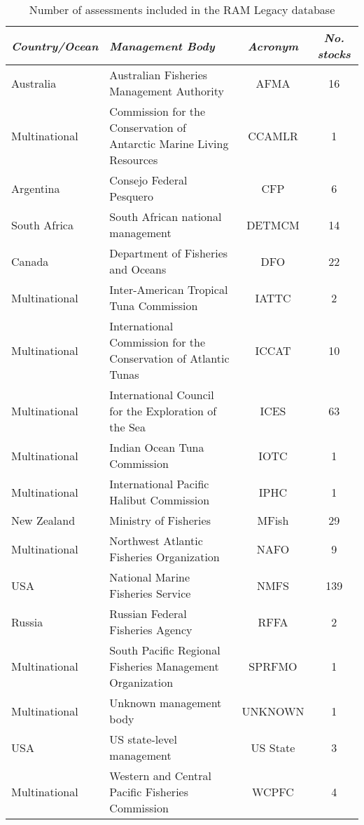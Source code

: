 \begin{table}[ht]
\begin{center}
\caption{Number of assessments included in the RAM Legacy database}
\label{tab:mgmt}
\begin{tabular}{p{3cm}p{5cm}cc}
\textit{Country/Ocean} & \textit{Management Body} & \textit{Acronym} & \textit{No. stocks} \\ \midrule
Australia & Australian Fisheries Management Authority & AFMA &  16 \\ 
  Multinational & Commission for the Conservation of Antarctic Marine Living Resources & CCAMLR &   1 \\ 
  Argentina & Consejo Federal Pesquero & CFP &   6 \\ 
  South Africa & South African national management & DETMCM &  14 \\ 
  Canada & Department of Fisheries and Oceans & DFO &  22 \\ 
  Multinational & Inter-American Tropical Tuna Commission & IATTC &   2 \\ 
  Multinational & International Commission for the Conservation of Atlantic Tunas & ICCAT &  10 \\ 
  Multinational & International Council for the Exploration of the Sea & ICES &  63 \\ 
  Multinational & Indian Ocean Tuna Commission & IOTC &   1 \\ 
  Multinational & International Pacific Halibut Commission & IPHC &   1 \\ 
  New Zealand & Ministry of Fisheries & MFish &  29 \\ 
  Multinational & Northwest Atlantic Fisheries Organization & NAFO &   9 \\ 
  USA & National Marine Fisheries Service & NMFS & 139 \\ 
  Russia & Russian Federal Fisheries Agency & RFFA &   2 \\ 
  Multinational & South Pacific Regional Fisheries Management Organization & SPRFMO &   1 \\ 
  Multinational & Unknown management body & UNKNOWN &   1 \\ 
  USA & US state-level management & US State &   3 \\ 
  Multinational & Western and Central Pacific Fisheries Commission & WCPFC &   4 \\ 
   \hline
\end{tabular}
\end{center}
\end{table}
